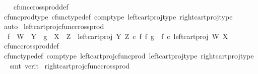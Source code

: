 \begin{isabellebody}
%
\isadelimproof
\ \ %
\endisadelimproof
%
\isatagproof
{}\isamarkupfalse%
\ cfunc{\isacharunderscore}{\kern0pt}cross{\isacharunderscore}{\kern0pt}prod{\isacharunderscore}{\kern0pt}def\isanewline
\ \ \isamarkupfalse%
\ cfunc{\isacharunderscore}{\kern0pt}prod{\isacharunderscore}{\kern0pt}type\ cfunc{\isacharunderscore}{\kern0pt}type{\isacharunderscore}{\kern0pt}def\ comp{\isacharunderscore}{\kern0pt}type\ left{\isacharunderscore}{\kern0pt}cart{\isacharunderscore}{\kern0pt}proj{\isacharunderscore}{\kern0pt}type\ right{\isacharunderscore}{\kern0pt}cart{\isacharunderscore}{\kern0pt}proj{\isacharunderscore}{\kern0pt}type\ \isamarkupfalse%
\ auto%
\endisatagproof
{\isafoldproof}%
%
\isadelimproof
\isanewline
%
\endisadelimproof
\isanewline
{}\isamarkupfalse%
\ left{\isacharunderscore}{\kern0pt}cart{\isacharunderscore}{\kern0pt}proj{\isacharunderscore}{\kern0pt}cfunc{\isacharunderscore}{\kern0pt}cross{\isacharunderscore}{\kern0pt}prod{\isacharcolon}{\kern0pt}\isanewline
\ \ {\isachardoublequoteopen}f\ {\isacharcolon}{\kern0pt}\ W\ {\isasymrightarrow}\ Y\ {\isasymLongrightarrow}\ g\ {\isacharcolon}{\kern0pt}\ X\ {\isasymrightarrow}\ Z\ {\isasymLongrightarrow}\ left{\isacharunderscore}{\kern0pt}cart{\isacharunderscore}{\kern0pt}proj\ Y\ Z\ {\isasymcirc}\isactrlsub c\ f\ {\isasymtimes}\isactrlsub f\ g\ {\isacharequal}{\kern0pt}\ f\ {\isasymcirc}\isactrlsub c\ left{\isacharunderscore}{\kern0pt}cart{\isacharunderscore}{\kern0pt}proj\ W\ X{\isachardoublequoteclose}\isanewline
%
\isadelimproof
\ \ %
\endisadelimproof
%
\isatagproof
{}\isamarkupfalse%
\ cfunc{\isacharunderscore}{\kern0pt}cross{\isacharunderscore}{\kern0pt}prod{\isacharunderscore}{\kern0pt}def\isanewline
\ \ \isamarkupfalse%
\ cfunc{\isacharunderscore}{\kern0pt}type{\isacharunderscore}{\kern0pt}def\ comp{\isacharunderscore}{\kern0pt}type\ left{\isacharunderscore}{\kern0pt}cart{\isacharunderscore}{\kern0pt}proj{\isacharunderscore}{\kern0pt}cfunc{\isacharunderscore}{\kern0pt}prod\ left{\isacharunderscore}{\kern0pt}cart{\isacharunderscore}{\kern0pt}proj{\isacharunderscore}{\kern0pt}type\ right{\isacharunderscore}{\kern0pt}cart{\isacharunderscore}{\kern0pt}proj{\isacharunderscore}{\kern0pt}type\ \isamarkupfalse%
\ {\isacharparenleft}{\kern0pt}smt\ {\isacharparenleft}{\kern0pt}verit{\isacharparenright}{\kern0pt}{\isacharparenright}{\kern0pt}%
\endisatagproof
{\isafoldproof}%
%
\isadelimproof
\isanewline
%
\endisadelimproof
\isanewline
{}\isamarkupfalse%
\ right{\isacharunderscore}{\kern0pt}cart{\isacharunderscore}{\kern0pt}proj{\isacharunderscore}{\kern0pt}cfunc{\isacharunderscore}{\kern0pt}cross{\isacharunderscore}{\kern0pt}prod{\isacharcolon}{\kern0pt}\isanewline

\end{isabellebody}
